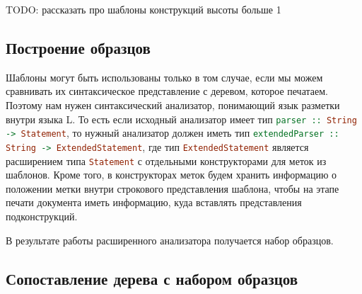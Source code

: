 TODO: рассказать про шаблоны конструкций высоты больше 1

\subsection{Построение образцов}

Шаблоны могут быть использованы только в том случае, если мы можем сравнивать их синтаксическое представление с деревом, которое печатаем. Поэтому нам нужен синтаксический анализатор, понимающий язык разметки внутри языка L. То есть если исходный анализатор имеет тип \lstinline[language=Haskell]{parser :: String -> Statement}, то нужный анализатор должен иметь тип \lstinline[language=Haskell]{extendedParser :: String -> ExtendedStatement}, где тип \lstinline[language=Haskell]{ExtendedStatement} является расширением типа \lstinline[language=Haskell]{Statement} с отдельными конструкторами для меток из шаблонов. Кроме того, в конструкторах меток будем хранить информацию о положении метки внутри строкового представления шаблона, чтобы на этапе печати документа иметь информацию, куда вставлять представления подконструкций.

В результате работы расширенного анализатора получается набор образцов.


% 	

% 	


\subsection{Сопоставление дерева с набором образцов}

